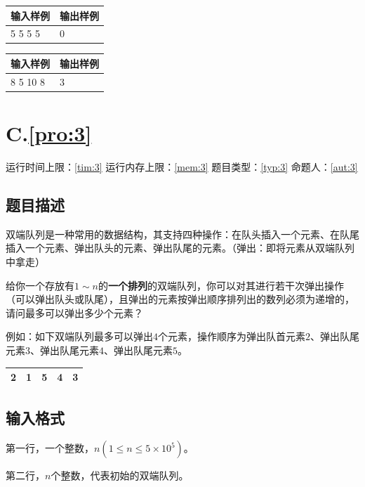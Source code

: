 \documentclass[
	lang=cn,
	color=green
]{elegantbook}
\begin{document}
\begin{tabularx}{450pt}{X|X}
	\toprule
	输入样例 & 输出样例 \\
	\midrule
	5 5 5 5  & 0        \\
	\bottomrule
\end{tabularx}
\vspace{0.5cm}

\begin{tabularx}{450pt}{X|X}
	\toprule
	输入样例 & 输出样例 \\
	\midrule
	8 5 10 8 & 3        \\
	\bottomrule
\end{tabularx}

\newpage
\chapter*{C.\quad \ref*{pro:3}}
\begin{center}
	运行时间上限：\ref*{tim:3} \quad 运行内存上限：\ref*{mem:3} \quad 题目类型：\ref*{typ:3} \quad 命题人：\ref*{aut:3}
\end{center}

\section*{题目描述}
双端队列是一种常用的数据结构，其支持四种操作：在队头插入一个元素、在队尾插入一个元素、弹出队头的元素、弹出队尾的元素。（弹出：即将元素从双端队列中拿走）

给你一个存放有$1 \sim n$的\textbf{一个排列}的双端队列，你可以对其进行若干次弹出操作（可以弹出队头或队尾），且弹出的元素按弹出顺序排列出的数列必须为递增的，请问最多可以弹出多少个元素？

例如：如下双端队列最多可以弹出$4$个元素，操作顺序为弹出队首元素$2$、弹出队尾元素$3$、弹出队尾元素$4$、弹出队尾元素$5$。

\begin{center}
	\begin{tabularx}{200pt}{M|M|M|M|M}
		 & 1 & 5 & 4 & 3 \\
		\bottomrule
	\end{tabularx}
\end{center}

\section*{输入格式}
第一行，一个整数，$n(1 \leq n \leq 5 \times 10^5)$。

第二行，$n$个整数，代表初始的双端队列。
\end{document}
